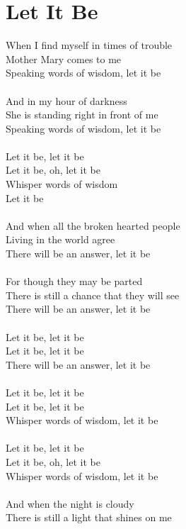 \section{Let It Be}
\begin{multicols}{2}
When I find myself in times of trouble\\
Mother Mary comes to me\\
Speaking words of wisdom, let it be\\
\\
And in my hour of darkness\\
She is standing right in front of me\\
Speaking words of wisdom, let it be\\
\\
Let it be, let it be\\
Let it be, oh, let it be\\
Whisper words of wisdom\\
Let it be\\
\\
And when all the broken hearted people\\
Living in the world agree\\
There will be an answer, let it be\\
\\
For though they may be parted\\
There is still a chance that they will see\\
There will be an answer, let it be\\
\\
Let it be, let it be\\
Let it be, let it be\\
There will be an answer, let it be\\
\\
Let it be, let it be\\
Let it be, let it be\\
Whisper words of wisdom, let it be\\
\columnbreak
\\
Let it be, let it be\\
Let it be, oh, let it be\\
Whisper words of wisdom, let it be\\
\\
And when the night is cloudy\\
There is still a light that shines on me\\

\end{multicols}
